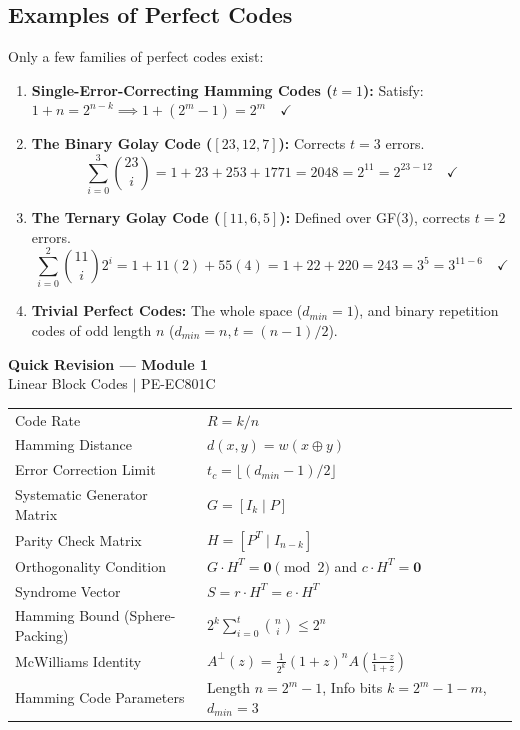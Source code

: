 \documentclass[12pt,a4paper]{article}
\renewcommand{\arraystretch}{1.45}
\begin{document}
\subsection{Examples of Perfect Codes}
Only a few families of perfect codes exist:
\begin{enumerate}[label=\textbf{\arabic*.}, leftmargin=*, itemsep=3pt]
  \item \textbf{Single-Error-Correcting Hamming Codes ($t=1$):}
    Satisfy: $1 + n = 2^{n-k} \implies 1 + (2^m - 1) = 2^m \quad \checkmark$
  \item \textbf{The Binary Golay Code ($[23, 12, 7]$):}
    Corrects $t=3$ errors.
    \[ \sum_{i=0}^3 \binom{23}{i} = 1 + 23 + 253 + 1771 = 2048 = 2^{11} = 2^{23-12} \quad \checkmark \]
  \item \textbf{The Ternary Golay Code ($[11, 6, 5]$):}
    Defined over GF(3), corrects $t=2$ errors.
    \[ \sum_{i=0}^2 \binom{11}{i} 2^i = 1 + 11(2) + 55(4) = 1 + 22 + 220 = 243 = 3^5 = 3^{11-6} \quad \checkmark \]
  \item \textbf{Trivial Perfect Codes:} The whole space ($d_{min}=1$), and binary repetition codes of odd length $n$ ($d_{min}=n, t = (n-1)/2$).
\end{enumerate}

\newpage
\begin{center}
  {\large\bfseries\color{myred} Quick Revision --- Module 1}\\[3pt]
  {\small\color{mydark} Linear Block Codes $|$ PE-EC801C}
\end{center}
\noindent{\color{myred}\rule{\linewidth}{1.2pt}}
\vspace{4pt}

\begin{tcolorbox}[formulabox, title={\textbf{Key Formulas and Metrics at a Glance}}]
\renewcommand{\arraystretch}{1.35}
\begin{tabularx}{\linewidth}{B{5.0cm} X}
Code Rate & $R = k/n$ \\[4pt]
Hamming Distance & $d(x, y) = w(x \oplus y)$ \\[4pt]
Error Correction Limit & $t_c = \lfloor (d_{min}-1)/2 \rfloor$ \\[4pt]
Systematic Generator Matrix & $G = [I_k \mid P]$ \\[4pt]
Parity Check Matrix & $H = [P^T \mid I_{n-k}]$ \\[4pt]
Orthogonality Condition & $G \cdot H^T = \mathbf{0} \pmod 2$ and $c \cdot H^T = \mathbf{0}$ \\[4pt]
Syndrome Vector & $S = r \cdot H^T = e \cdot H^T$ \\[4pt]
Hamming Bound (Sphere-Packing) & $2^k \sum_{i=0}^t \binom{n}{i} \le 2^n$ \\[4pt]
McWilliams Identity & $A^\perp(z) = \frac{1}{2^k} (1+z)^n A\left( \frac{1-z}{1+z} \right)$ \\[4pt]
Hamming Code Parameters & Length $n = 2^m-1$, Info bits $k = 2^m-1-m$, $d_{min}=3$
\end{tabularx}
\end{tcolorbox}
\end{document}
